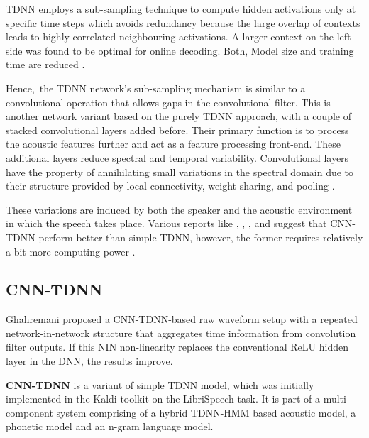 TDNN employs a sub-sampling technique to compute hidden activations only at specific time steps which avoids redundancy because the large overlap of contexts leads to highly correlated neighbouring activations. A larger context on the left side was found to be optimal for online decoding. Both, Model size and training time are reduced \cite{georgescu_performance_2021}.

Hence, the TDNN network's sub-sampling mechanism is similar to a convolutional operation that allows gaps in the convolutional filter. This is another network variant based on the purely TDNN approach, with a couple of stacked convolutional layers added before. Their primary function is to process the acoustic features further and act as a feature processing front-end. These additional layers reduce spectral and temporal variability. Convolutional layers have the property of annihilating small variations in the spectral domain due to their structure provided by local connectivity, weight sharing, and pooling \cite{georgescu_performance_2021}.

These variations are induced by both the speaker and the acoustic environment in which the speech takes place. Various reports like \cite{abdel-hamid_convolutional_2014}, \cite{zorila_investigation_2019}, \cite{biswas_semi-supervised_2019}, \cite{noauthor_tdnn_nodate} and \cite{kreyssig_improved_2018} suggest that CNN-TDNN perform better than simple TDNN, however, the former requires relatively a bit more computing power \cite{georgescu_performance_2021}.

\subsection{CNN-TDNN}

Ghahremani \cite{ghahremani_acoustic_2016} proposed a CNN-TDNN-based raw waveform setup with a repeated network-in-network structure that aggregates time information from convolution filter outputs. If this NIN non-linearity replaces the conventional ReLU hidden layer in the DNN, the results improve. 

\textbf{CNN-TDNN} is a variant of simple TDNN model, which was initially implemented in the Kaldi toolkit on the LibriSpeech task. It is part of a multi-component system comprising of a hybrid TDNN-HMM based acoustic model, a phonetic model and an n-gram language model. 

